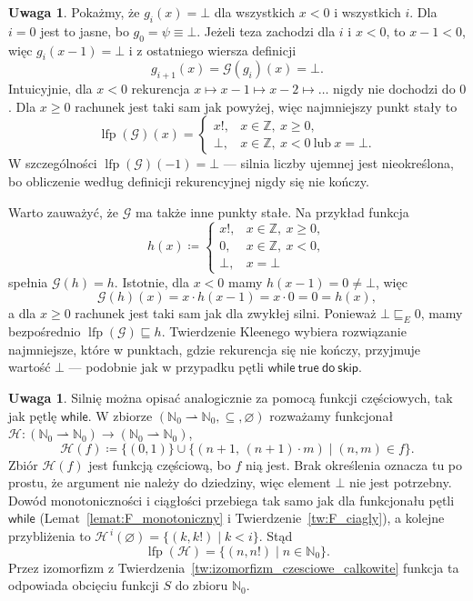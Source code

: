 \documentclass[11pt,a4paper]{article}
\theoremstyle{definition}
\newtheorem{uwaga}[definicja]{Uwaga}
\theoremstyle{plain}
\newcommand{\bt}{\bot}                            %
\newcommand{\lfp}{\operatorname{lfp}}
\newcommand{\kw}[1]{\ensuremath{\mathsf{#1}}} %
\begin{document}
\begin{uwaga}
	Pokażmy, że $g_i(x)=\bt$ dla wszystkich $x<0$ i wszystkich $i$. Dla $i=0$
	jest to jasne, bo $g_0=\psi\equiv\bt$. Jeżeli teza zachodzi dla $i$ i
	$x<0$, to $x-1<0$, więc $g_i(x-1)=\bt$ i z ostatniego wiersza definicji
	\[
	g_{i+1}(x)=\mathcal G(g_i)(x)=\bt.
	\]
	Intuicyjnie, dla $x<0$ rekurencja $x\mapsto x-1\mapsto x-2\mapsto\ldots$
	nigdy nie dochodzi do $0$. Dla $x\geq0$ rachunek jest taki sam jak
	powyżej, więc najmniejszy punkt stały to
	\[
	\lfp(\mathcal G)(x)=
	\begin{cases}
		x!, & x\in\mathbb Z,\ x\geq0,\\
		\bt, & x\in\mathbb Z,\ x<0\ \text{lub}\ x=\bt.
	\end{cases}
	\]
	W szczególności $\lfp(\mathcal G)(-1)=\bt$ --- silnia liczby ujemnej
	jest nieokreślona, bo obliczenie według definicji rekurencyjnej nigdy
	się nie kończy.
	
	Warto zauważyć, że $\mathcal G$ ma także inne punkty stałe. Na przykład
	funkcja
	\[
	h(x)\coloneqq
	\begin{cases}
		x!, & x\in\mathbb Z,\ x\geq0,\\
		0, & x\in\mathbb Z,\ x<0,\\
		\bt, & x=\bt
	\end{cases}
	\]
	spełnia $\mathcal G(h)=h$. Istotnie, dla $x<0$ mamy $h(x-1)=0\neq\bt$,
	więc
	\[
	\mathcal G(h)(x)=x\cdot h(x-1)=x\cdot0=0=h(x),
	\]
	a dla $x\geq0$ rachunek jest taki sam jak dla zwykłej silni. Ponieważ
	$\bt\sqsubseteq_E 0$, mamy bezpośrednio $\lfp(\mathcal G)\sqsubseteq h$. Twierdzenie
	Kleenego wybiera rozwiązanie najmniejsze, które w punktach, gdzie
	rekurencja się nie kończy, przyjmuje wartość $\bt$ --- podobnie jak w
	przypadku pętli $\kw{while}\ \kw{true}\ \kw{do}\ \kw{skip}$.
\end{uwaga}

\begin{uwaga}\label{uw:silnia_czesciowe}
	Silnię można opisać analogicznie za pomocą funkcji częściowych, tak jak
	pętlę $\kw{while}$. W zbiorze
	$(\mathbb N_0\rightharpoonup\mathbb N_0,\subseteq,\varnothing)$
	rozważamy funkcjonał
	$\mathcal H:(\mathbb N_0\rightharpoonup\mathbb N_0)\to(\mathbb N_0\rightharpoonup\mathbb N_0)$,
	\[
	\mathcal H(f)\coloneqq\{(0,1)\}\cup\{(n+1,\,(n+1)\cdot m)\mid (n,m)\in f\}.
	\]
	Zbiór $\mathcal H(f)$ jest funkcją częściową, bo $f$ nią jest. Brak
	określenia oznacza tu po prostu, że argument nie należy do dziedziny,
	więc element $\bt$ nie jest potrzebny. Dowód monotoniczności i ciągłości
	przebiega tak samo jak dla funkcjonału pętli $\kw{while}$
	(Lemat~\ref{lemat:F_monotoniczny} i Twierdzenie~\ref{tw:F_ciagly}),
	a kolejne przybliżenia to
	$\mathcal H^{\,i}(\varnothing)=\{(k,k!)\mid k<i\}$. Stąd
	\[
	\lfp(\mathcal H)=\{(n,n!)\mid n\in\mathbb N_0\}.
	\]
	Przez izomorfizm z Twierdzenia~\ref{tw:izomorfizm_czesciowe_calkowite}
	funkcja ta odpowiada obcięciu funkcji $S$ do zbioru $\mathbb N_0$.
\end{uwaga}
\end{document}
